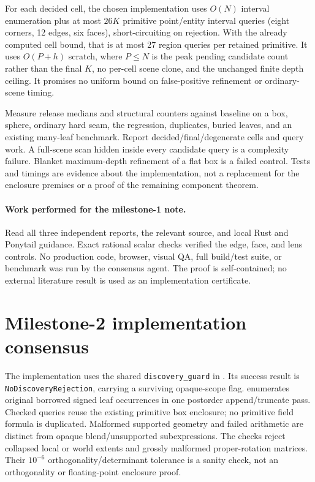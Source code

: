 \documentclass[11pt]{article}
\begin{document}
For each decided cell, the chosen implementation uses \(O(N)\) interval
enumeration plus at most \(26K\) primitive point/entity interval queries
(eight corners, 12 edges, six faces), short-circuiting on rejection. With
the already computed cell bound, that is at most 27 region queries per
retained primitive. It uses \(O(P+h)\) scratch, where \(P\le N\) is the peak
pending candidate count rather than the final \(K\), no per-cell scene clone,
and the unchanged finite depth ceiling. It promises no uniform bound on
false-positive refinement or ordinary-scene timing.

Measure release medians and structural counters against baseline on a box,
sphere, ordinary hard seam, the regression, duplicates, buried leaves, and an
existing many-leaf benchmark. Report decided/final/degenerate cells and query
work. A full-scene scan hidden inside every candidate query is a complexity
failure. Blanket maximum-depth refinement of a flat box is a failed control.
Tests and timings are evidence about the implementation, not a replacement
for the enclosure premises or a proof of the remaining component theorem.

\paragraph{Work performed for the milestone-1 note.}
Read all three independent reports, the relevant source, and local Rust and
Ponytail guidance. Exact rational scalar checks verified the edge, face, and
lens controls. No production code, browser, visual QA, full build/test suite,
or benchmark was run by the consensus agent. The proof is self-contained;
no external literature result is used as an implementation certificate.

\section{Milestone-2 implementation consensus}

The implementation uses the shared \texttt{discovery\_guard} in
. Its success result is
\texttt{NoDiscoveryRejection}, carrying a surviving opaque-scope flag.
 enumerates original borrowed signed leaf
occurrences in one postorder append/truncate pass. Checked queries reuse the
existing primitive box enclosure; no primitive field formula is duplicated.
Malformed supported geometry and failed arithmetic are distinct from opaque
blend/unsupported subexpressions. The checks reject collapsed local or world
extents and grossly malformed proper-rotation matrices. Their \(10^{-6}\)
orthogonality/determinant tolerance is a sanity check, not an orthogonality
or floating-point enclosure proof.
\end{document}
